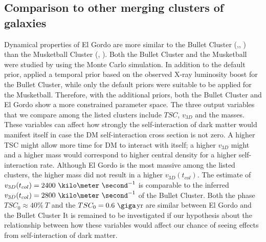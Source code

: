 \subsection{Comparison to other merging clusters of galaxies}
%
Dynamical properties of El Gordo are more similar to the Bullet Cluster
(\citealt{Bradac2008b},\citealt{Springel2007},
\citealt{Mastropietro2008a})
than the Musketball Cluster (\citealt{Dawson12}, ). Both the Bullet Cluster and the Musketball
were studied by  using the Monte Carlo simulation.
In addition to the default prior,  applied a temporal prior
based on the observed X-ray luminosity boost for the Bullet Cluster, while
only the default priors were suitable to be applied for the Musketball.
Therefore, with the additional priors, both the Bullet Cluster and El Gordo
show a more constrained parameter space. 
The three output variables that we compare among the listed clusters include $TSC$,
$v_{3D}$ and the masses. These variables can affect
how strongly the self-interaction of dark matter would manifest itself in
case the DM self-interaction cross section is not zero. A higher TSC might
allow more time for DM to interact with itself; a higher $v_{3D}$ might
 and a higher mass would correspond to
higher central density for a higher self-interaction rate. Although El
Gordo is the most massive among the listed clusters, the higher mass did not result in a higher $v_{3D}(t_{col})$.
The estimate of $v_{3D}(t_{col}) = 2400~\kilo\meter~\second^{-1}$ is
comparable to the inferred $v_{3D}(t_{col}) =
2800~\kilo\meter~\second^{-1}$ of the Bullet Cluster. 
Both the phase $TSC_0  \approx 40\%~T$ and the $TSC_0 = 0.6~\giga$yr are
similar between El Gordo and the Bullet Cluster
It is remained to be investigated if our hypothesis about the relationship
between how these variables would affect our chance of seeing effects from
self-interaction of dark matter. 

